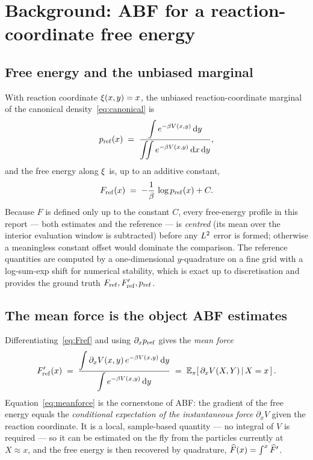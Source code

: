 \section{Background: ABF for a reaction-coordinate free energy}
\label{sec:abf}

\subsection{Free energy and the unbiased marginal}
With reaction coordinate $\xi(x,y)=x$, the unbiased reaction-coordinate
marginal of the canonical density~\eqref{eq:canonical} is
\begin{equation}
  p_{\mathrm{ref}}(x) \;=\;
  \frac{\displaystyle\int e^{-\beta V(x,y)}\,\mathrm{d} y}
       {\displaystyle\iint e^{-\beta V(x,y)}\,\mathrm{d} x\,\mathrm{d} y},
  \label{eq:pref}
\end{equation}
and the free energy along $\xi$ is, up to an additive constant,
\begin{equation}
  F_{\mathrm{ref}}(x) \;=\; -\frac{1}{\beta}\,\log p_{\mathrm{ref}}(x) + C.
  \label{eq:Fref}
\end{equation}
Because $F$ is defined only up to the constant $C$, every free-energy profile in
this report --- both estimates and the reference --- is \emph{centred} (its mean
over the interior evaluation window is subtracted) before any $L^2$ error is
formed; otherwise a meaningless constant offset would dominate the comparison.
The reference quantities are computed by a one-dimensional $y$-quadrature on a
fine grid with a log-sum-exp shift for numerical stability, which is exact up to
discretisation and provides the ground truth $F_{\mathrm{ref}},F'_{\mathrm{ref}},p_{\mathrm{ref}}$.

\subsection{The mean force is the object ABF estimates}
Differentiating~\eqref{eq:Fref} and using $\partial_x p_{\mathrm{ref}}$ gives the
\emph{mean force}
\begin{equation}
  F'_{\mathrm{ref}}(x) \;=\;
  \frac{\displaystyle\int \partial_x V(x,y)\,e^{-\beta V(x,y)}\,\mathrm{d} y}
       {\displaystyle\int e^{-\beta V(x,y)}\,\mathrm{d} y}
  \;=\; \mathbb{E}_{\pi}\!\left[\,\partial_x V(X,Y)\,\middle|\, X=x\,\right].
  \label{eq:meanforce}
\end{equation}
Equation~\eqref{eq:meanforce} is the cornerstone of ABF: the gradient of the
free energy equals the \emph{conditional expectation of the instantaneous force}
$\partial_x V$ given the reaction coordinate. It is a local, sample-based
quantity --- no integral of $V$ is required --- so it can be estimated on the
fly from the particles currently at $X\approx x$, and the free energy is then
recovered by quadrature, $\widehat{F}(x)=\int^x \widehat{F}'$.

